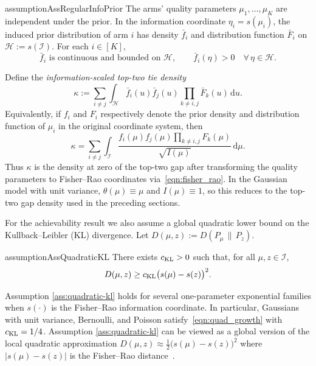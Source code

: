 \documentclass[10pt]{article}
\newcommand{\dd}{\mathrm{d}}
\theoremstyle{plain}
\begin{document}
\begin{restatable}{assumption}{AssRegularInfoPrior}
\label{ass:regular-info-prior}
The arms' quality parameters \(\mu_1,\ldots,\mu_K\) are independent under the prior. In the information coordinate \(\eta_i=s(\mu_i)\), the induced prior distribution of arm \(i\) has density \(\bar f_i\) and distribution function \(\bar F_i\) on \(\mathcal H:=s(\mathcal I)\). For each \(i\in[K]\),
\[
    \bar f_i \text{ is continuous and bounded on }\mathcal H,
    \qquad
    \bar f_i(\eta)>0 \quad \forall\, \eta\in\mathcal H .
\]
\end{restatable}
Define the \emph{information-scaled top-two tie density}
\[
    \kappa
    :=
    \sum_{i\neq j}
    \int_{\mathcal H}
        \bar f_i(u)\bar f_j(u)
        \prod_{k\neq i,j}\bar F_k(u)
    \,\dd u .
\]
Equivalently, if \(f_i\) and \(F_i\) respectively denote the prior density and distribution function
of \(\mu_i\) in the original coordinate system, then
\[
    \kappa
    =
    \sum_{i\neq j}
    \int_{\mathcal I}
        \frac{
            f_i(\mu)f_j(\mu)\prod_{k\neq i,j}F_k(\mu)
        }{\sqrt{I(\mu)}}
    \,\dd\mu .
\]
Thus \(\kappa\) is the density at zero of the top-two gap after 
transforming the quality parameters to Fisher--Rao coordinates via~\eqref{eqn:fisher_rao}.
In the Gaussian   model with unit variance, $\theta(\mu)\equiv\mu$ and 
\(I(\mu)\equiv1\), so this reduces to the top-two gap density used in the preceding
sections.

For the achievability result we also assume a global quadratic lower bound on
the Kullback--Leibler (KL) divergence. Let
$ 
    D(\mu,z):=D(P_\mu\,\|\,P_z) .%
$

\begin{restatable}{assumption}{AssQuadraticKL} \label{ass:quadratic-kl}
There exists \(c_{\rm KL}>0\) such that, for all \(\mu,z\in\mathcal I\),
\begin{equation}
    D(\mu,z)
    \ge
    c_{\rm KL}\big(s(\mu)-s(z)\big)^2 . \label{eqn:quad_growth}
\end{equation}
\end{restatable}
Assumption \ref{ass:quadratic-kl} holds for several one-parameter exponential families when $s(\cdot)$ is  the Fisher--Rao information coordinate. In particular,   Gaussians with unit variance, Bernoulli,  and Poisson  satisfy~\eqref{eqn:quad_growth} with $c_{\rm KL}=1/4$.  Assumption \ref{ass:quadratic-kl} can be viewed as a global version of the local quadratic approximation $D(\mu,z)\approx\frac{1}{2}\big(s(\mu)-s( z)\big)^2$ where $|s(\mu)-s( z)|$ is the Fisher--Rao distance~\citep{amari2000methods}.
\end{document}
